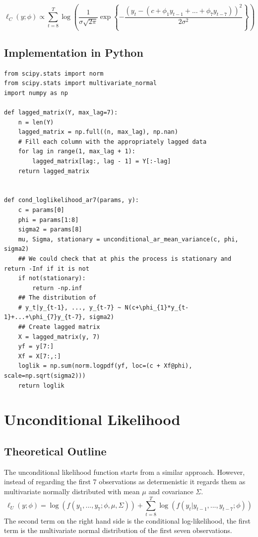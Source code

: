 \documentclass{article}
\begin{document}
\begin{equation}
\ell_C (y; \phi) \propto \sum_{t=8}^T \log \left( \frac{1}{\sigma \sqrt{2\pi}} \exp \left\{-\frac{(y_t - (c+ \phi_1y_{t-1} + ... + \phi_7 y_{t-7} ))^2}{2\sigma^2} \right\} \right)
\end{equation}
\subsection{Implementation in Python}

\begin{verbatim}
from scipy.stats import norm
from scipy.stats import multivariate_normal
import numpy as np

def lagged_matrix(Y, max_lag=7):
    n = len(Y)
    lagged_matrix = np.full((n, max_lag), np.nan)    
    # Fill each column with the appropriately lagged data
    for lag in range(1, max_lag + 1):
        lagged_matrix[lag:, lag - 1] = Y[:-lag]
    return lagged_matrix


def cond_loglikelihood_ar7(params, y):
    c = params[0] 
    phi = params[1:8]
    sigma2 = params[8]
    mu, Sigma, stationary = unconditional_ar_mean_variance(c, phi, sigma2)
    ## We could check that at phis the process is stationary and return -Inf if it is not
    if not(stationary):
        return -np.inf
    ## The distribution of 
    # y_t|y_{t-1}, ..., y_{t-7} ~ N(c+\phi_{1}*y_{t-1}+...+\phi_{7}y_{t-7}, sigma2)
    ## Create lagged matrix
    X = lagged_matrix(y, 7)
    yf = y[7:]
    Xf = X[7:,:]
    loglik = np.sum(norm.logpdf(yf, loc=(c + Xf@phi), scale=np.sqrt(sigma2)))
    return loglik
\end{verbatim}

\section{Unconditional Likelihood}
\subsection{Theoretical Outline}
The unconditional likelihood function starts from a similar approach.
However, instead of regarding the first 7 observations as determenistic it regards them as multivariate normally distributed with mean $\mu$ and covariance $\Sigma$.
\begin{equation}
\ell_U (y; \phi) = \log( f(y_1,..., y_7;\phi, \mu, \Sigma))+\sum_{t=8}^T \log (f(y_t|y_{t-1},..., y_{t-7};\phi))
\end{equation}
The second term on the right hand side is the conditional log-likelihood, the first term is the multivariate normal distribution of the first seven observations.
\end{document}
